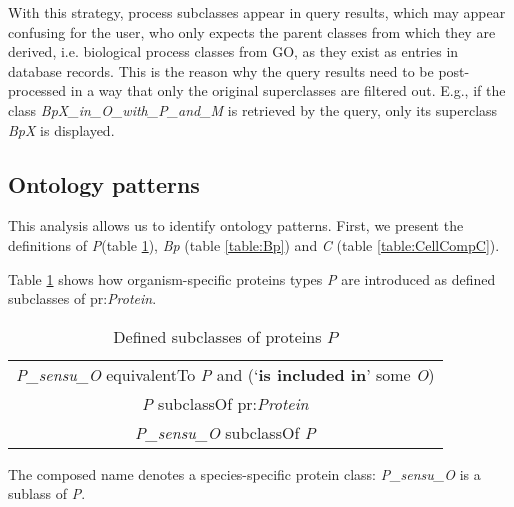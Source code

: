 With this strategy, process subclasses appear in query results, which may appear confusing for the user, who only expects the parent classes from which they are derived, i.e. biological process classes from GO, as they exist as entries in database records. 
%
This is the reason why the query results need to be post-processed in a way that only the original superclasses are filtered out. E.g., 
if the class \textit{BpX\_in\_O\_with\_P\_and\_M} is retrieved by the query, only its superclass \textit{BpX} is displayed. 

\subsection*{Ontology patterns}

This analysis allows us to identify ontology patterns. First, we present the definitions of \textit{P}(table \ref{table:ProteinP}), \textit{Bp} (table \ref{table:Bp}) and \textit{C} (table \ref{table:CellCompC}). 

Table \ref{table:ProteinP} shows how organism-specific proteins types \textit{P} are introduced as defined subclasses of pr:\textit{Protein}.

\begin{table}[H]
	\caption{Defined subclasses of proteins $P$}
	\label{table:ProteinP}
	\centering
	\begin{tabular}{c}
		\hline
		\textit{P\_sensu\_O} equivalentTo \textit{P} and (`\textbf{is included in}' some \textit{O}) \\
		\textit{P} subclassOf pr:\textit{Protein} \\ 
		\textit{P\_sensu\_O} subclassOf \textit{P} \\
		\hline
	\end{tabular}
\end{table}%
\noindent
 The composed name denotes a species-specific protein class: \textit{P\_sensu\_O} is a sublass of \textit{P}.

